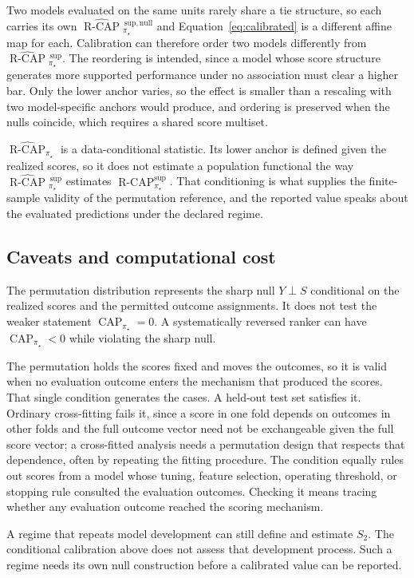 \documentclass[11pt]{article}
\newcommand{\CAP}{\operatorname{CAP}}
\newcommand{\RCAP}{\operatorname{R\text{-}CAP}^{\mathrm{sup}}_{\pi_\star}}
\newcommand{\RCAPHat}{\widehat{\operatorname{R\text{-}CAP}}{}^{\,\mathrm{sup}}_{\pi_\star}}
\newcommand{\RCAPnullHat}{\widehat{\operatorname{R\text{-}CAP}}{}^{\,\mathrm{sup,null}}_{\pi_\star}}
\newcommand{\RCAPcalHat}{\widehat{\operatorname{R\text{-}CAP}}_{\pi_\star}}
\theoremstyle{remark}
\begin{document}
Two models evaluated on the same units rarely share a tie structure, so each carries its own $\RCAPnullHat$ and Equation~\eqref{eq:calibrated} is a different affine map for each. Calibration can therefore order two models differently from $\RCAPHat$. The reordering is intended, since a model whose score structure generates more supported performance under no association must clear a higher bar. Only the lower anchor varies, so the effect is smaller than a rescaling with two model-specific anchors would produce, and ordering is preserved when the nulls coincide, which requires a shared score multiset.

$\RCAPcalHat$ is a data-conditional statistic. Its lower anchor is defined given the realized scores, so it does not estimate a population functional the way $\RCAPHat$ estimates $\RCAP$. That conditioning is what supplies the finite-sample validity of the permutation reference, and the reported value speaks about the evaluated predictions under the declared regime.

\subsection{Caveats and computational cost}
\label{sec:caveats}

The permutation distribution represents the sharp null $Y\perp S$ conditional on the realized scores and the permitted outcome assignments. It does not test the weaker statement $\CAP_{\pi_\star}=0$. A systematically reversed ranker can have $\CAP_{\pi_\star}<0$ while violating the sharp null.

The permutation holds the scores fixed and moves the outcomes, so it is valid when no evaluation outcome enters the mechanism that produced the scores. That single condition generates the cases. A held-out test set satisfies it. Ordinary cross-fitting fails it, since a score in one fold depends on outcomes in other folds and the full outcome vector need not be exchangeable given the full score vector; a cross-fitted analysis needs a permutation design that respects that dependence, often by repeating the fitting procedure. The condition equally rules out scores from a model whose tuning, feature selection, operating threshold, or stopping rule consulted the evaluation outcomes. Checking it means tracing whether any evaluation outcome reached the scoring mechanism.

A regime that repeats model development can still define and estimate $S_2$. The conditional calibration above does not assess that development process. Such a regime needs its own null construction before a calibrated value can be reported.
\end{document}
